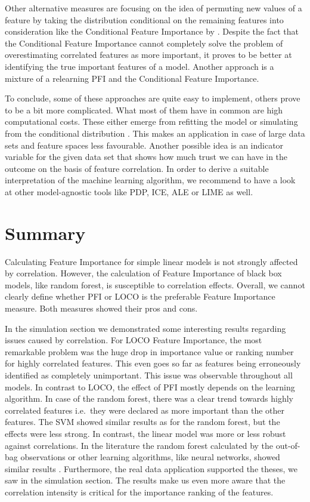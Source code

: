 \documentclass[]{krantz}
\begin{document}
Other alternative measures are focusing on the idea of permuting new
values of a feature by taking the distribution conditional on the
remaining features into consideration like the Conditional Feature
Importance by \citet{strobl2008}. Despite the fact that the Conditional
Feature Importance cannot completely solve the problem of overestimating
correlated features as more important, it proves to be better at
identifying the true important features of a model. Another approach is
a mixture of a relearning PFI \citep{mentch2016} and the Conditional
Feature Importance. \citep{hooker2019}

To conclude, some of these approaches are quite easy to implement,
others prove to be a bit more complicated. What most of them have in
common are high computational costs. These either emerge from refitting
the model or simulating from the conditional distribution
\citep{hooker2019}. This makes an application in case of large data sets
and feature spaces less favourable. Another possible idea is an
indicator variable for the given data set that shows how much trust we
can have in the outcome on the basis of feature correlation. In order to
derive a suitable interpretation of the machine learning algorithm, we
recommend to have a look at other model-agnostic tools like PDP, ICE,
ALE or LIME as well.

\section{Summary}\label{summary-1}

Calculating Feature Importance for simple linear models is not strongly
affected by correlation. However, the calculation of Feature Importance
of black box models, like random forest, is susceptible to correlation
effects. Overall, we cannot clearly define whether PFI or LOCO is the
preferable Feature Importance measure. Both measures showed their pros
and cons.

In the simulation section we demonstrated some interesting results
regarding issues caused by correlation. For LOCO Feature Importance, the
most remarkable problem was the huge drop in importance value or ranking
number for highly correlated features. This even goes so far as features
being erroneously identified as completely unimportant. This issue was
observable throughout all models. In contrast to LOCO, the effect of PFI
mostly depends on the learning algorithm. In case of the random forest,
there was a clear trend towards highly correlated features i.e.~they
were declared as more important than the other features. The SVM showed
similar results as for the random forest, but the effects were less
strong. In contrast, the linear model was more or less robust against
correlations. In the literature the random forest calculated by the
out-of-bag observations or other learning algorithms, like neural
networks, showed similar results \citep{hooker2019}. Furthermore, the
real data application supported the theses, we saw in the simulation
section. The results make us even more aware that the correlation
intensity is critical for the importance ranking of the features.
\end{document}
